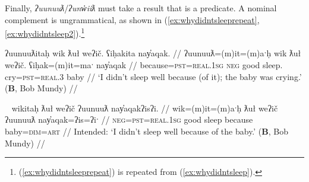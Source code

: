 
Finally, \textit{ʔuunuuƛ}/\textit{ʔunw̓iiƛ} must take a result that is a predicate. A nominal complement is ungrammatical, as shown in (\ref{ex:whydidntsleeprepeat}, \ref{ex:whydidntsleep2}).\footnote{(\ref{ex:whydidntsleeprepeat}) is repeated from (\ref{ex:whydidntsleep}).}

\ex \label{ex:whydidntsleeprepeat}
\begingl
\glpreamble ʔuunuuƛitaḥ wik ƛuł weʔič. ʕiḥakita nay̓aqak. //
\gla ʔuunuuƛ=(m)it=(m)aˑḥ wik ƛuł weʔič. ʕiḥak=(m)it=maˑ nay̓aqak //
\glb because=\textsc{pst}=\textsc{real.1sg} \textsc{neg} good sleep. cry=\textsc{pst}=\textsc{real.3} baby //
\glft `I didn't sleep well because (of it); the baby was crying.' (\textbf{B}, Bob Mundy) //
\endgl
\xe

\ex~ \label{ex:whydidntsleep2}
\begingl
\glpreamble *wikitaḥ ƛuł weʔič ʔuunuuƛ nay̓aqakʔisʔi. //
\gla wik=(m)it=(m)aˑḥ ƛuł weʔič ʔuunuuƛ nay̓aqak=ʔis=ʔiˑ //
\glb \textsc{neg}=\textsc{pst}=\textsc{real.1sg} good sleep because baby=\textsc{dim}=\textsc{art} //
\glft Intended: `I didn't sleep well because of the baby.' (\textbf{B}, Bob Mundy) //
\endgl
\xe

\begin{comment}
\ex~ \label{ex:uunuutl4}
\begingl
\glpreamble *hitaʔapweʔin kaatkimqsuptaał t̓an̓eʔisʔi ʔuunuuƛ našuk. //
\gla hitaʔap=weˑʔin kaatkimqsuptaał t̓an̓a=ʔis=ʔiˑ ʔuunuuƛ našuk //
\glb win=\textsc{hrsy.3} race child=\textsc{dim}=\textsc{art} because strong //
\glft Intended: `The kid won the race because he is strong.' (\textbf{B}, Bob Mundy) //
\endgl
\xe

\vspace{5pt}
\end{comment}

\begin{comment}
Becausitives also follow the typical verbal pattern of being able to freely drop arguments, already seen in (\ref{ex:uunuutl1}) and again in (\ref{ex:becausechanged}).

\vspace{5pt}

Context for (\ref{ex:becausechanged}): A retelling of traditional ways of life. This followed an explanation of how this isn't done anymore, and a lengthy pause.

\ex~ \label{ex:becausechanged}
\begingl
\glpreamble ʔunʔuuƛ̓aƛʔał kʷiisḥin. //
\gla ʔunʔuuƛ=!aƛ=ʔał kʷis-L.ḥin //
\glb because=\textsc{now}=\textsc{pl} different-\textsc{dr} //
\glft `Because they're different now.' (\textbf{C}, \textit{tupaat} Julia Lucas) //
\endgl
\xe
\end{comment}

